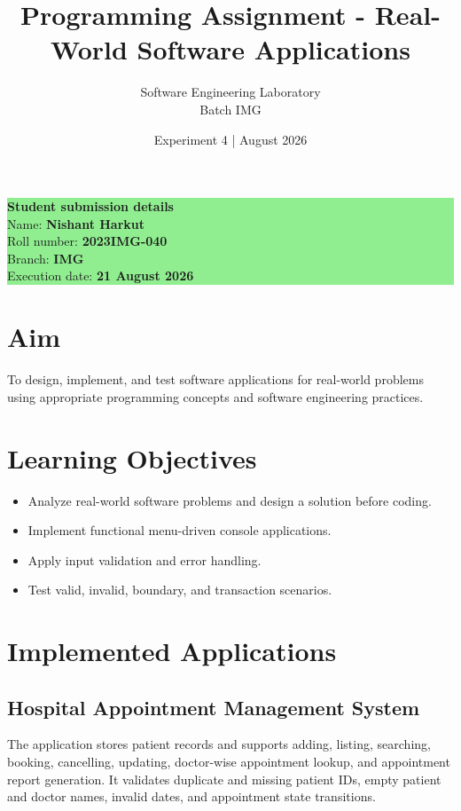 \documentclass[11pt,a4paper]{article}
\title{\textbf{Programming Assignment - Real-World Software Applications}}
\author{Software Engineering Laboratory\\Batch IMG}
\date{Experiment 4 \quad | \quad 21 August 2026}
\begin{document}
\maketitle

\begin{center}
\colorbox{lightgreen}{\parbox{0.9\linewidth}{\centering
\textbf{Student submission details}\\[6pt]
Name: \textbf{Nishant Harkut}\\[6pt]
Roll number: \textbf{2023IMG-040}\\[6pt]
Branch: \textbf{IMG}\\[6pt]
Execution date: \textbf{21 August 2026}
}}
\end{center}

\section{Aim}
To design, implement, and test software applications for real-world problems
using appropriate programming concepts and software engineering practices.

\section{Learning Objectives}
\begin{itemize}[leftmargin=*]
  \item Analyze real-world software problems and design a solution before coding.
  \item Implement functional menu-driven console applications.
  \item Apply input validation and error handling.
  \item Test valid, invalid, boundary, and transaction scenarios.
\end{itemize}

\section{Implemented Applications}

\subsection{Hospital Appointment Management System}
The application stores patient records and supports adding, listing, searching,
booking, cancelling, updating, doctor-wise appointment lookup, and appointment
report generation. It validates duplicate and missing patient IDs, empty patient
and doctor names, invalid dates, and appointment state transitions.
\end{document}

